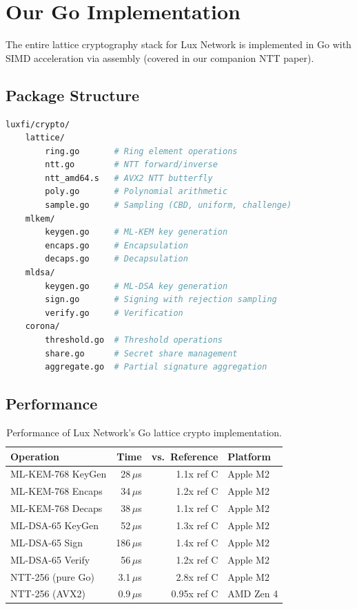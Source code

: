 \section{Our Go Implementation}


The entire lattice cryptography stack for Lux Network is implemented in Go with SIMD
acceleration via assembly (covered in our companion NTT paper).

\subsection{Package Structure}

\begin{lstlisting}[language=bash,caption={Package layout}]
luxfi/crypto/
    lattice/
        ring.go       # Ring element operations
        ntt.go        # NTT forward/inverse
        ntt_amd64.s   # AVX2 NTT butterfly
        poly.go       # Polynomial arithmetic
        sample.go     # Sampling (CBD, uniform, challenge)
    mlkem/
        keygen.go     # ML-KEM key generation
        encaps.go     # Encapsulation
        decaps.go     # Decapsulation
    mldsa/
        keygen.go     # ML-DSA key generation
        sign.go       # Signing with rejection sampling
        verify.go     # Verification
    corona/
        threshold.go  # Threshold operations
        share.go      # Secret share management
        aggregate.go  # Partial signature aggregation
\end{lstlisting}

\subsection{Performance}

\begin{table}[H]
\centering
\small
\begin{tabular}{@{}lrrl@{}}
\toprule
\textbf{Operation} & \textbf{Time} & \textbf{vs.\ Reference} & \textbf{Platform} \\
\midrule
ML-KEM-768 KeyGen & 28\,$\mu$s & 1.1x ref C & Apple M2 \\
ML-KEM-768 Encaps & 34\,$\mu$s & 1.2x ref C & Apple M2 \\
ML-KEM-768 Decaps & 38\,$\mu$s & 1.1x ref C & Apple M2 \\
ML-DSA-65 KeyGen & 52\,$\mu$s & 1.3x ref C & Apple M2 \\
ML-DSA-65 Sign & 186\,$\mu$s & 1.4x ref C & Apple M2 \\
ML-DSA-65 Verify & 56\,$\mu$s & 1.2x ref C & Apple M2 \\
NTT-256 (pure Go) & 3.1\,$\mu$s & 2.8x ref C & Apple M2 \\
NTT-256 (AVX2) & 0.9\,$\mu$s & 0.95x ref C & AMD Zen 4 \\
\bottomrule
\end{tabular}
\caption{Performance of Lux Network's Go lattice crypto implementation.}
\end{table}

